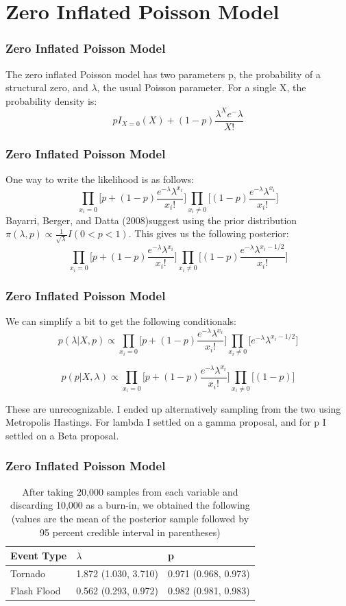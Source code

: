 \documentclass{beamer}
\begin{document}
	\section{Zero Inflated Poisson Model}
	\begin{frame}
		\frametitle{Zero Inflated Poisson Model}
		The zero inflated Poisson model has two parameters p, the probability of a structural zero, and $\lambda$, the usual Poisson parameter. 
		For a single X, the probability density is:
		$$pI_{X=0}(X) + (1-p)\frac{\lambda^Xe^-\lambda}{X!}$$
	\end{frame}
	\begin{frame}
		\frametitle{Zero Inflated Poisson Model}
		One way to write the likelihood is as follows:
		$$\prod_{x_i=0}\bigg[p+(1-p)\frac{e^{-\lambda}\lambda^{x_i}}{x_i!}\bigg]\prod_{x_i \ne 0}\bigg[(1-p)\frac{e^{-\lambda}\lambda^{x_i}}{x_i!}\bigg]$$
		Bayarri, Berger, and Datta (2008)\footnotemark suggest using the prior distribution $\pi(\lambda, p) \propto \frac{1}{\sqrt{\lambda}}I(0<p<1)$. This gives us the following posterior:
		$$\prod_{x_i=0}\bigg[p+(1-p)\frac{e^{-\lambda}\lambda^{x_i}}{x_i!}\bigg]\prod_{x_i \ne 0}\bigg[(1-p)\frac{e^{-\lambda}\lambda^{x_i - 1/2}}{x_i!}\bigg]$$
	\end{frame}
	\begin{frame}
		\frametitle{Zero Inflated Poisson Model}
		We can simplify a bit to get the following conditionals:
		\[
p(\lambda|X, p) \propto \prod_{x_i=0}\bigg[p+(1-p)\frac{e^{-\lambda}\lambda^{x_i}}{x_i!}\bigg]\prod_{x_i \ne 0}\bigg[e^{-\lambda}\lambda^{x_i - 1/2}\bigg]
\]

\[
p(p|X, \lambda) \propto \prod_{x_i=0}\bigg[p+(1-p)\frac{e^{-\lambda}\lambda^{x_i}}{x_i!}\bigg]\prod_{x_i \ne 0}\bigg[(1-p)\bigg]
\]

These are unrecognizable. I ended up alternatively sampling from the two using Metropolis Hastings. For lambda I settled on a gamma proposal, and for p I settled on a Beta proposal. 
	\end{frame}
	\begin{frame}
		\frametitle{Zero Inflated Poisson Model}
		\begin{table}
    \centering
    \caption{After taking 20,000 samples from each variable and discarding 10,000 as a burn-in, we obtained the following (values are the mean of the posterior sample followed by 95 percent credible interval in parentheses)}
    \label{t:rZIP}
    \begin{tabular}{| l | l | l |}
    \hline
    Event Type & $\lambda$ & p  \\ \hline
    Tornado & 1.872 (1.030, 3.710) & 0.971 (0.968, 0.973) \\ \hline
    Flash Flood & 0.562 (0.293, 0.972) & 0.982 (0.981, 0.983) \\ \hline
    \end{tabular}
\end{table}
	\end{frame}
\end{document}
